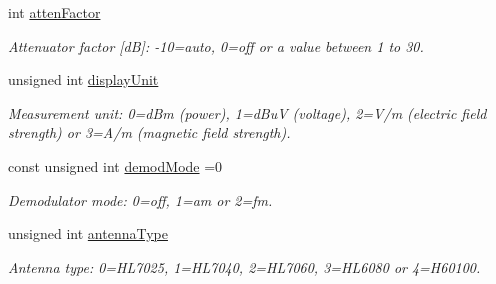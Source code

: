 \begin{DoxyCompactItemize}
\item 
\mbox{\label{structSpectranConfigurator_1_1FixedParameters_aa5eb199d61f2c5763e32b70d2bf7c368}} 
int \hyperlink{structSpectranConfigurator_1_1FixedParameters_aa5eb199d61f2c5763e32b70d2bf7c368}{atten\+Factor}
\begin{DoxyCompactList}\small\item\em Attenuator factor \mbox{[}dB\mbox{]}\+: -\/10=auto, 0=off or a value between 1 to 30. \end{DoxyCompactList}\item 
\mbox{\label{structSpectranConfigurator_1_1FixedParameters_ad8a37b8a7981c811f1e8f89770ba2a7d}} 
unsigned int \hyperlink{structSpectranConfigurator_1_1FixedParameters_ad8a37b8a7981c811f1e8f89770ba2a7d}{display\+Unit}
\begin{DoxyCompactList}\small\item\em Measurement unit\+: 0=d\+Bm (power), 1=d\+BuV (voltage), 2=V/m (electric field strength) or 3=A/m (magnetic field strength). \end{DoxyCompactList}\item 
\mbox{\label{structSpectranConfigurator_1_1FixedParameters_ad9255da208ff6b07f5a591f3dea22f84}} 
const unsigned int \hyperlink{structSpectranConfigurator_1_1FixedParameters_ad9255da208ff6b07f5a591f3dea22f84}{demod\+Mode} =0
\begin{DoxyCompactList}\small\item\em Demodulator mode\+: 0=off, 1=am or 2=fm. \end{DoxyCompactList}\item 
\mbox{\label{structSpectranConfigurator_1_1FixedParameters_a29f211747f28dc036ac1e8d894db7dd4}} 
unsigned int \hyperlink{structSpectranConfigurator_1_1FixedParameters_a29f211747f28dc036ac1e8d894db7dd4}{antenna\+Type}
\begin{DoxyCompactList}\small\item\em Antenna type\+: 0=H\+L7025, 1=H\+L7040, 2=H\+L7060, 3=H\+L6080 or 4=H60100. \end{DoxyCompactList}\item 
\mbox{\label{structSpectranConfigurator_1_1FixedParameters_af1eeef76fb85a2ccf937f3dd949d9980}} 

\end{DoxyCompactItemize}

